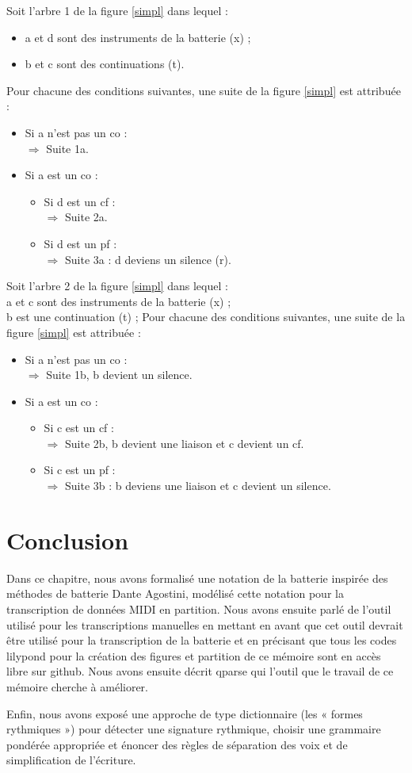 Soit l’arbre 1 de la figure \ref{simpl} dans lequel :
\begin{itemize}
    \item a et d sont des instruments de la batterie (x) ;
    \item b et c sont des continuations (t).
\end{itemize}
Pour chacune des conditions suivantes, une suite de la
figure \ref{simpl} est attribuée :
\begin{itemize}
	\item Si a n’est pas un co :\\
	$\Rightarrow$ Suite 1a.
	\item Si a est un co :
	\begin{itemize}
		\item Si d est un cf :\\
		$\Rightarrow$ Suite 2a.
		\item Si d est un pf :\\
		$\Rightarrow$ Suite 3a : d deviens un silence (r).\\
	\end{itemize}
\end{itemize}
Soit l’arbre 2 de la figure \ref{simpl} dans lequel :\\
a et c sont des instruments de la batterie (x) ;\\
b est une continuation (t) ;
Pour chacune des conditions suivantes, une suite de la figure \ref{simpl} est
attribuée :
\begin{itemize}
	\item Si a n’est pas un co :\\
	$\Rightarrow$ Suite 1b, b devient un silence.
	\item Si a est un co :
	\begin{itemize}
		\item Si c est un cf :\\
		$\Rightarrow$ Suite 2b, b devient une liaison et c devient un cf.
		\item Si c est un pf :\\
		$\Rightarrow$ Suite 3b : b deviens une liaison et c devient un silence.
	\end{itemize}
\end{itemize}

\section*{Conclusion}
Dans ce chapitre, nous avons formalisé une notation de la batterie inspirée des
méthodes de batterie Dante Agostini, modélisé cette notation pour
la transcription de données MIDI en partition.
Nous avons ensuite parlé de l’outil utilisé pour les transcriptions manuelles
en mettant en avant que cet outil devrait être utilisé pour la transcription de
la batterie et en précisant que tous les codes lilypond pour la création des
figures et partition de ce mémoire sont en accès libre sur github. Nous avons
ensuite décrit qparse qui l’outil que le travail de ce mémoire cherche à
améliorer.

Enfin, nous avons exposé une approche de type dictionnaire (les « formes
rythmiques ») pour détecter une signature rythmique, choisir une grammaire
pondérée appropriée et énoncer des règles de séparation des voix et de
simplification de l’écriture.
